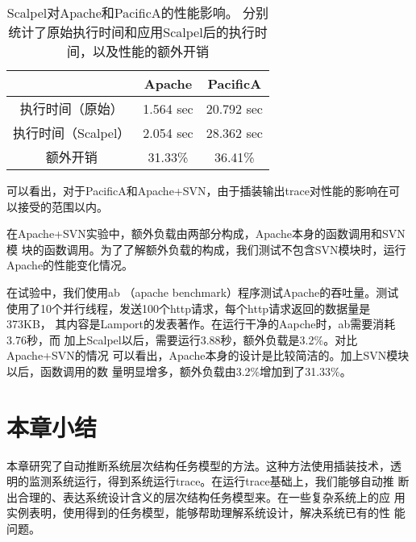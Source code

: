 \begin{table}[htbp]
\small
\centering
\begin{minipage}{0.8\linewidth}
\centering
\caption{Scalpel对Apache和PacificA的性能影响。
分别统计了原始执行时间和应用Scalpel后的执行时间，以及性能的额外开销}
\label{fig:perf}
\begin{tabular}{ccc}

\toprule[1.5pt]
  		& Apache	& PacificA \\
\midrule[1pt]
执行时间（原始）& 1.564 sec	& 20.792 sec \\
执行时间（Scalpel）& 2.054 sec	& 28.362 sec \\
额外开销	& 31.33\%       & 36.41\% \\
\bottomrule[1.5pt]
\end{tabular}
\end{minipage}
\end{table}

可以看出，对于PacificA和Apache+SVN，由于插装输出trace对性能的影响在可
以接受的范围以内。

在Apache+SVN实验中，额外负载由两部分构成，Apache本身的函数调用和SVN模
块的函数调用。为了了解额外负载的构成，我们测试不包含SVN模块时，运行
Apache的性能变化情况。

在试验中，我们使用ab （apache benchmark）程序测试Apache的吞吐量。测试
使用了10个并行线程，发送100个http请求，每个http请求返回的数据量是373KB，
其内容是Lamport的发表著作。在运行干净的Aapche时，ab需要消耗3.76秒，而
加上Scalpel以后，需要运行3.88秒，额外负载是3.2\%。对比Apache+SVN的情况
可以看出，Apache本身的设计是比较简洁的。加上SVN模块以后，函数调用的数
量明显增多，额外负载由3.2\%增加到了31.33\%。

\section{本章小结}
\label{sec:scp:conclusion}

本章研究了自动推断系统层次结构任务模型的方法。这种方法使用插装技术，透
明的监测系统运行，得到系统运行trace。在运行trace基础上，我们能够自动推
断出合理的、表达系统设计含义的层次结构任务模型来。在一些复杂系统上的应
用实例表明，使用得到的任务模型，能够帮助理解系统设计，解决系统已有的性
能问题。

